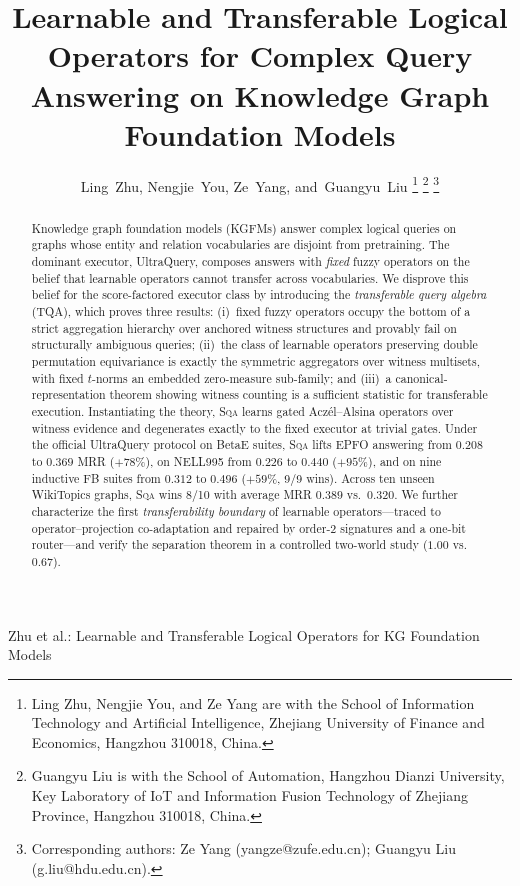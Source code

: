 \documentclass[journal]{IEEEtran}
\newcommand{\SQA}{\textsc{Sqa}}
\begin{document}
\title{Learnable and Transferable Logical Operators for Complex Query
Answering on Knowledge Graph Foundation Models}

\author{Ling~Zhu,
        Nengjie~You,
        Ze~Yang,
        and~Guangyu~Liu%
\thanks{Ling Zhu, Nengjie You, and Ze Yang are with the School of Information
Technology and Artificial Intelligence, Zhejiang University of Finance and
Economics, Hangzhou 310018, China.}
\thanks{Guangyu Liu is with the School of Automation, Hangzhou Dianzi
University, Key Laboratory of IoT and Information Fusion Technology of
Zhejiang Province, Hangzhou 310018, China.}
\thanks{Corresponding authors: Ze Yang (yangze@zufe.edu.cn); Guangyu Liu
(g.liu@hdu.edu.cn).}}

%
{Zhu et al.: Learnable and Transferable Logical Operators for KG Foundation Models}

\maketitle

\begin{abstract}
Knowledge graph foundation models (KGFMs) answer complex logical queries
on graphs whose entity and relation vocabularies are disjoint from
pretraining. The dominant executor, UltraQuery, composes answers with
\emph{fixed} fuzzy operators on the belief that learnable operators
cannot transfer across vocabularies. We disprove this belief for the
score-factored executor class by
introducing the \emph{transferable query algebra} (TQA), which proves
three results: (i)~fixed fuzzy operators occupy the bottom of a strict
aggregation hierarchy over anchored witness structures and provably
fail on structurally ambiguous queries; (ii)~the class of learnable
operators preserving double permutation equivariance is exactly the
symmetric aggregators over witness multisets, with fixed $t$-norms an
embedded zero-measure sub-family; and (iii)~a canonical-representation
theorem showing witness counting is a sufficient statistic for
transferable execution. Instantiating the theory, \SQA{} learns gated
Acz\'el--Alsina operators over witness evidence and degenerates exactly
to the fixed executor at trivial gates. Under the official UltraQuery
protocol on BetaE suites, \SQA{} lifts EPFO answering from $0.208$ to
$0.369$ MRR ($+78\%$), on NELL995 from $0.226$ to $0.440$ ($+95\%$),
and on nine inductive FB suites from $0.312$ to $0.496$ ($+59\%$,
9/9 wins). Across ten unseen WikiTopics graphs, \SQA{} wins 8/10 with
average MRR $0.389$ vs.\ $0.320$. We further characterize the first
\emph{transferability boundary} of learnable operators---traced to
operator--projection co-adaptation and repaired by order-2 signatures
and a one-bit router---and verify the separation theorem in a controlled
two-world study ($1.00$ vs.\ $0.67$).
\end{abstract}
\end{document}
